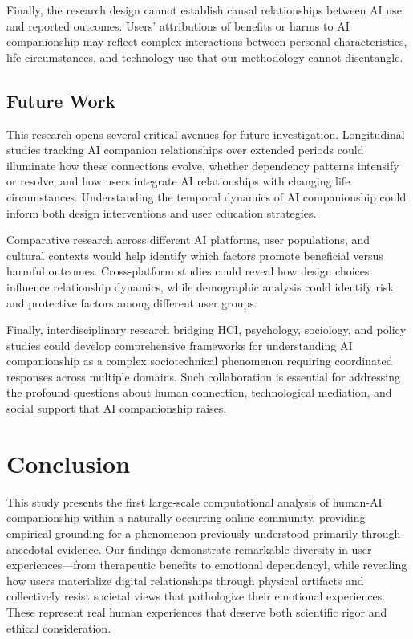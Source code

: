 \documentclass[sigconf, nonacm]{acmart}
\begin{document}
Finally, the research design cannot establish causal relationships between AI use and reported outcomes. Users' attributions of benefits or harms to AI companionship may reflect complex interactions between personal characteristics, life circumstances, and technology use that our methodology cannot disentangle.

\subsection{Future Work}
This research opens several critical avenues for future investigation. Longitudinal studies tracking AI companion relationships over extended periods could illuminate how these connections evolve, whether dependency patterns intensify or resolve, and how users integrate AI relationships with changing life circumstances. Understanding the temporal dynamics of AI companionship could inform both design interventions and user education strategies.

Comparative research across different AI platforms, user populations, and cultural contexts would help identify which factors promote beneficial versus harmful outcomes. Cross-platform studies could reveal how design choices influence relationship dynamics, while demographic analysis could identify risk and protective factors among different user groups.

Finally, interdisciplinary research bridging HCI, psychology, sociology, and policy studies could develop comprehensive frameworks for understanding AI companionship as a complex sociotechnical phenomenon requiring coordinated responses across multiple domains. Such collaboration is essential for addressing the profound questions about human connection, technological mediation, and social support that AI companionship raises.

\section{Conclusion}
This study presents the first large-scale computational analysis of human-AI companionship within a naturally occurring online community, providing empirical grounding for a phenomenon previously understood primarily through anecdotal evidence. Our findings demonstrate remarkable diversity in user experiences—from therapeutic benefits to emotional dependencyl, while revealing how users materialize digital relationships through physical artifacts and collectively resist societal views that pathologize their emotional experiences. These represent real human experiences that deserve both scientific rigor and ethical consideration.
\end{document}

